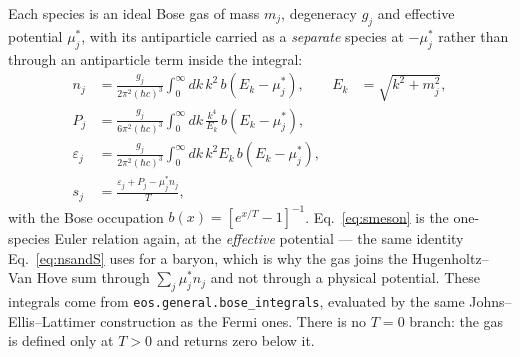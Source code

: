 \documentclass[aps,prc,onecolumn,superscriptaddress,nofootinbib,10pt]{revtex4-2}
\newcommand{\hc}{(\hbar c)^3}
\begin{document}
Each species is an ideal Bose gas of mass $m_j$, degeneracy $g_j$ and
effective potential $\mu^*_j$, with its antiparticle carried as a
\emph{separate} species at $-\mu^*_j$ rather than through an antiparticle term
inside the integral:
%
\begin{align}
n_j &= \frac{g_j}{2\pi^2 \hc} \int_0^\infty \! dk\, k^2\, b(E_k - \mu^*_j) ,
      & E_k &= \sqrt{k^2 + m_j^2} ,
\label{eq:nmeson} \\
P_j &= \frac{g_j}{6\pi^2 \hc} \int_0^\infty \! dk\, \frac{k^4}{E_k}\,
       b(E_k - \mu^*_j) ,
\label{eq:Pmeson} \\
\varepsilon_j &= \frac{g_j}{2\pi^2 \hc} \int_0^\infty \! dk\, k^2 E_k\,
       b(E_k - \mu^*_j) ,
\label{eq:epsmeson} \\
s_j &= \frac{\varepsilon_j + P_j - \mu^*_j n_j}{T} ,
\label{eq:smeson}
\end{align}
%
with the Bose occupation $b(x) = [e^{x/T} - 1]^{-1}$. Eq.~\eqref{eq:smeson} is
the one-species Euler relation again, at the \emph{effective} potential --- the
same identity Eq.~\eqref{eq:nsandS} uses for a baryon, which is why the gas
joins the Hugenholtz--Van Hove sum through $\sum_j \mu^*_j n_j$ and not
through a physical potential. These integrals come from
\texttt{eos.general.bose\_integrals}, evaluated by the same
Johns--Ellis--Lattimer construction as the Fermi ones. There is no $T = 0$
branch: the gas is defined only at $T > 0$ and returns zero below it.
\end{document}
